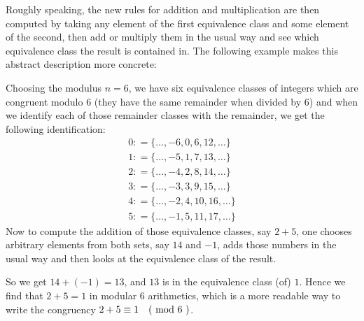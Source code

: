Roughly speaking, the new rules for addition and multiplication are then computed by taking any element of the first equivalence class and some element of the second, then add or multiply them in the usual way and see which equivalence class the result is contained in.
The following example makes this abstract description more concrete:
\begin{example} 
\label{def_residue_ring_z_6}
Choosing the modulus $ n = 6 $, we have six equivalence classes of integers which are congruent modulo $ 6 $ (they have the same remainder when divided by $6$) and when we identify each of those remainder classes with the remainder, we get the following identification:
$$
\begin{array}{l}
0: = \{\ldots, -6,0,6,12, \ldots \}\\
1: = \{\ldots, -5,1,7,13, \ldots \}\\
2: = \{\ldots, -4,2,8,14, \ldots \} \\
3: = \{\ldots, -3,3,9,15, \ldots \}\\
4: = \{\ldots, -2,4,10,16, \ldots \}\\
5: = \{\ldots, -1,5,11,17, \ldots \}
\end{array}
$$
Now to compute the addition of those equivalence classes, say $2+5$, one chooses arbitrary elements from both sets, say $14$ and $-1$, adds those numbers in the usual way and then looks at the equivalence class of the result. 

So we get $14+(-1)=13$, and $13$ is in the equivalence class (of) $1$. Hence we find that $2+5=1$ in modular $6$ arithmetics, which is a more readable way to write the congruency $2+5 \equiv 1 \quad \text{( mod } 6 \text{ )}$.


\end{example}
